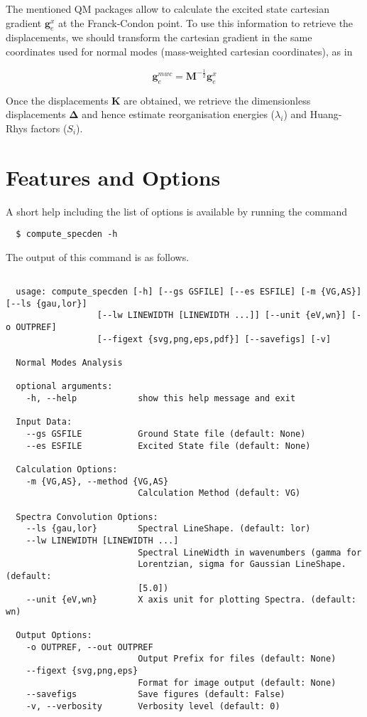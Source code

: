 \documentclass[a4paper]{article}
\newcommand{\matr}[1]{\mathbf{#1}}
\begin{document}
The mentioned QM packages allow to calculate the excited state cartesian gradient $\matr{g}^x_e$ at the Franck-Condon point. To use this information to retrieve the displacements, we should transform the cartesian gradient in the same coordinates used for normal modes (mass-weighted cartesian coordinates), as in

\begin{equation}
\matr{g}^{mwc}_e = \matr{M}^{-\frac{1}{2}}\matr{g}^x_e
\end{equation}

Once the displacements $\matr{K}$ are obtained, we retrieve the dimensionless displacements $\matr{\Delta}$ and hence estimate reorganisation energies ($\lambda_i$) and Huang-Rhys factors ($S_i$).


\section{Features and Options}
\label{Options}
A short help including the list of options is available by running the command

\begin{verbatim}
  $ compute_specden -h
\end{verbatim}

The output of this command is as follows.

\begin{verbatim}
 
  usage: compute_specden [-h] [--gs GSFILE] [--es ESFILE] [-m {VG,AS}] [--ls {gau,lor}]
                  [--lw LINEWIDTH [LINEWIDTH ...]] [--unit {eV,wn}] [-o OUTPREF]
                  [--figext {svg,png,eps,pdf}] [--savefigs] [-v]

  Normal Modes Analysis

  optional arguments:
    -h, --help            show this help message and exit

  Input Data:
    --gs GSFILE           Ground State file (default: None)
    --es ESFILE           Excited State file (default: None)

  Calculation Options:
    -m {VG,AS}, --method {VG,AS}
                          Calculation Method (default: VG)

  Spectra Convolution Options:
    --ls {gau,lor}        Spectral LineShape. (default: lor)
    --lw LINEWIDTH [LINEWIDTH ...]
                          Spectral LineWidth in wavenumbers (gamma for
                          Lorentzian, sigma for Gaussian LineShape. (default:
                          [5.0])
    --unit {eV,wn}        X axis unit for plotting Spectra. (default: wn)

  Output Options:
    -o OUTPREF, --out OUTPREF
                          Output Prefix for files (default: None)
    --figext {svg,png,eps}
                          Format for image output (default: None)
    --savefigs            Save figures (default: False)
    -v, --verbosity       Verbosity level (default: 0)

\end{verbatim}
\end{document}
